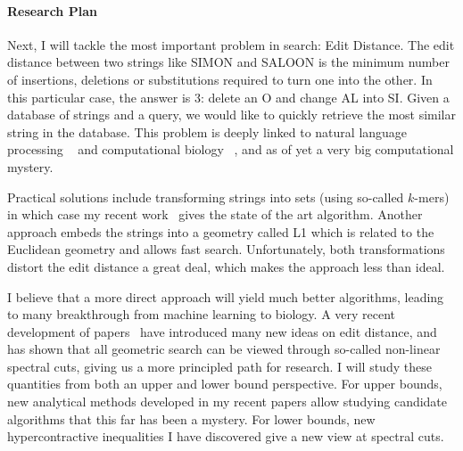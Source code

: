 \documentclass[10pt]{article}
\begin{document}

\paragraph{Research Plan}

Next, I will tackle the most important problem in search: Edit Distance.
The edit distance between two strings like SIMON and SALOON is the minimum number of insertions, deletions or substitutions required to turn one into the other.
In this particular case, the answer is 3: delete an O and change AL into SI.
Given a database of strings and a query, we would like to quickly retrieve the most similar string in the database.
This problem is deeply linked to natural language processing
~\cite{sidorov2015computing}
and computational biology
~\cite{mcgrane2016biological},
and as of yet a very big computational mystery.

Practical solutions include transforming strings into sets (using so-called $k$-mers) in which case my recent work~\cite{ahle2019subsets} gives the state of the art algorithm.
Another approach embeds the strings into a geometry called L1
which is related to the Euclidean geometry and allows fast search.
Unfortunately, both transformations distort the edit distance a great deal, which makes the approach less than ideal.

I believe that a more direct approach will yield much better algorithms, leading to many breakthrough from machine learning to biology.
A very recent development of papers~\cite{
   chakraborty2018approximating,
   haeupler2019near%
}
have introduced many new ideas on edit distance,
and~\cite{andoni2018data} has shown that all geometric search can be viewed through so-called non-linear spectral cuts, giving us a more principled path for research.
I will study these quantities from both an upper and lower bound perspective.
For upper bounds, new analytical methods developed in my recent papers allow studying candidate algorithms that this far has been a mystery.
For lower bounds, new hypercontractive inequalities I have discovered give a new view at spectral cuts.

\clearpage
\phantom{,}
\vspace{1cm}


\end{document}
